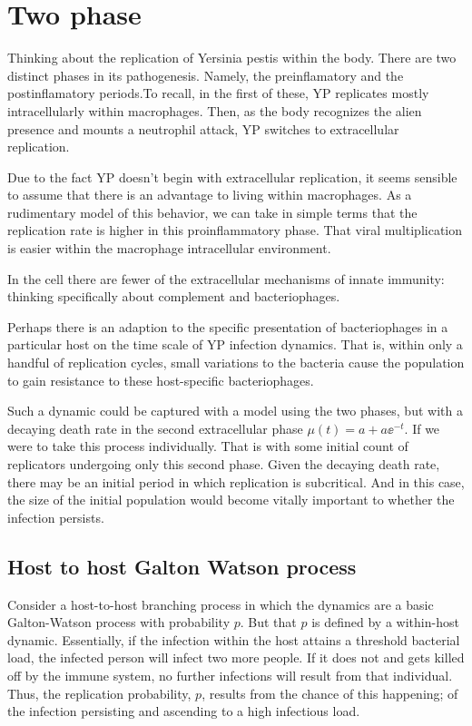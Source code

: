\section{Two phase}



Thinking about the replication of Yersinia pestis within the body. There are two distinct phases in its pathogenesis. Namely, the preinflamatory and the postinflamatory periods.To recall,  in the first of these, YP replicates mostly intracellularly within macrophages. Then, as the body recognizes the alien presence and mounts a neutrophil attack, YP switches to extracellular replication. 

Due to the fact YP doesn't begin with extracellular replication, it seems sensible to assume that there is an advantage to living within macrophages. As a rudimentary model of this behavior, we can take in simple terms that the replication rate is higher in this proinflammatory phase. That viral multiplication is easier within the macrophage intracellular environment. 

In the cell there are fewer of the extracellular mechanisms of innate immunity: thinking specifically about complement and bacteriophages. 

Perhaps there is an adaption to the specific presentation of bacteriophages in a particular host on the time scale of YP infection dynamics. That is, within only a handful of replication cycles, small variations to the bacteria cause the population to gain resistance to these host-specific bacteriophages. 

Such a dynamic could be captured with a model using the two phases, but with a decaying death rate in the second extracellular phase
$\mu(t) = a + a\ee^{-t}$. If we were to take this process individually. That is with some initial count of replicators undergoing only this second phase. Given the decaying death rate, there may be an initial period in which replication is subcritical. And in this case, the size of the initial population would become vitally important to whether the infection persists.



\subsection{Host to host Galton Watson process}



Consider a host-to-host branching process in which the dynamics are a basic Galton-Watson process with probability $p$. But that $p$ is defined by a within-host dynamic. Essentially, if the infection within the host attains a threshold bacterial load, the infected person will infect two more people. If it does not and gets killed off by the immune system, no further infections will result from that individual. Thus, the replication probability, $p$, results from the chance of this happening; of the infection persisting and ascending to a high infectious load. \par

